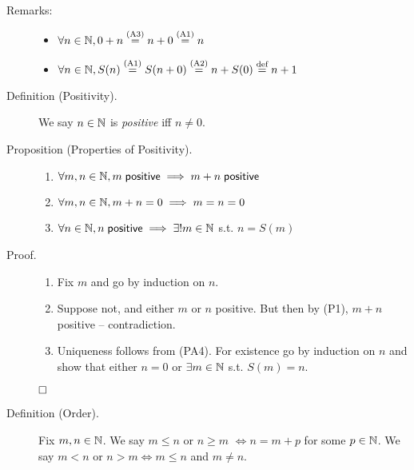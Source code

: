 \documentclass[letterpaper,11pt]{article}
\begin{document}
\begin{description}

\item[Remarks:]\mbox{}
  \begin{itemize}
  \item $\forall n\in\mathbb{N}, 0+n \stackrel{\text{(A3)}}{=} n+0 \stackrel{\text{(A1)}}{=} n$
  \item $\forall n\in\mathbb{N}, S(n) \stackrel{\text{(A1)}}{=} S(n+0) \stackrel{\text{(A2)}}{=} n+S(0) \stackrel{\text{def}}{=} n+1$
  \end{itemize}


\item[Definition (Positivity).] We say $n\in\mathbb{N}$ is \textit{positive} iff $n\ne0$.

\item[Proposition (Properties of Positivity).]\mbox{}
  \begin{enumerate}[(P1)]
  \item $\forall m,n\in\mathbb{N}, m\;\mathsf{positive}\implies m+n\;\mathsf{positive}$
  \item $\forall m,n\in\mathbb{N}, m+n=0 \implies m=n=0$
  \item $\forall n\in\mathbb{N}, n\;\mathsf{positive}\implies \exists! m\in\mathbb{N}$ s.t. $n=S(m)$
  \end{enumerate}

\item[Proof.]\mbox{}
  \begin{enumerate}[(P1)]
  \item Fix $m$ and go by induction on $n$.
  \item Suppose not, and either $m$ or $n$ positive.
      But then by (P1), $m+n$ positive -- contradiction.
  \item Uniqueness follows from (PA4). For existence go by induction on $n$
      and show that either $n=0$ or $\exists m\in\mathbb{N}$ s.t. $S(m)=n$.
  \end{enumerate}
  $\hfill\square$


\item[Definition (Order).] Fix $m,n\in\mathbb{N}$. We say $m\le n$ or $n\ge m$
    $\iff n=m+p$ for some $p\in\mathbb{N}$. We say $m<n$ or $n>m \iff m\le n$
    and $m\ne n$.


\end{description}
\end{document}

